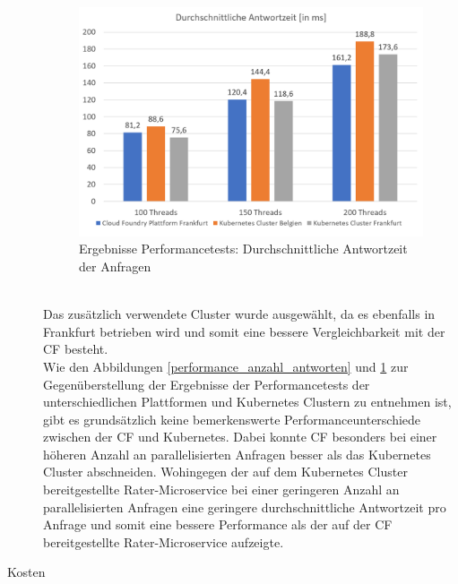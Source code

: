 \begin{description}
\begin{figure}[h]
\begin{center}
		\end{center}
	\end{figure}
	\begin{figure}[h]
		\begin{center}
			\includegraphics[width=13cm]{img/Performance_Response_Time.PNG}
			\caption[Ergebnisse Performancetests: Durchschnittliche Antwortzeit der Anfragen]{Ergebnisse Performancetests: Durchschnittliche Antwortzeit der Anfragen}
			\label{performance_antwortzeit}
		\end{center}
	\end{figure}
	\\
	Das zusätzlich verwendete Cluster wurde ausgewählt, da es ebenfalls in Frankfurt betrieben wird und somit eine bessere Vergleichbarkeit mit der \ac{CF} besteht.\\
	Wie den Abbildungen \ref{performance_anzahl_antworten} und \ref{performance_antwortzeit} zur Gegenüberstellung der Ergebnisse der Performancetests der unterschiedlichen Plattformen und Kubernetes Clustern zu entnehmen ist, gibt es grundsätzlich keine bemerkenswerte Performanceunterschiede zwischen der \ac{CF} und Kubernetes. Dabei konnte \ac{CF} besonders bei einer höheren Anzahl an parallelisierten Anfragen besser als das Kubernetes Cluster abschneiden. Wohingegen der auf dem Kubernetes Cluster bereitgestellte Rater-Microservice bei einer geringeren Anzahl an parallelisierten Anfragen eine geringere durchschnittliche Antwortzeit pro Anfrage und somit eine bessere Performance als der auf der \ac{CF} bereitgestellte Rater-Microservice aufzeigte.\\
\item[Kosten] \hfill \\

\end{description}
